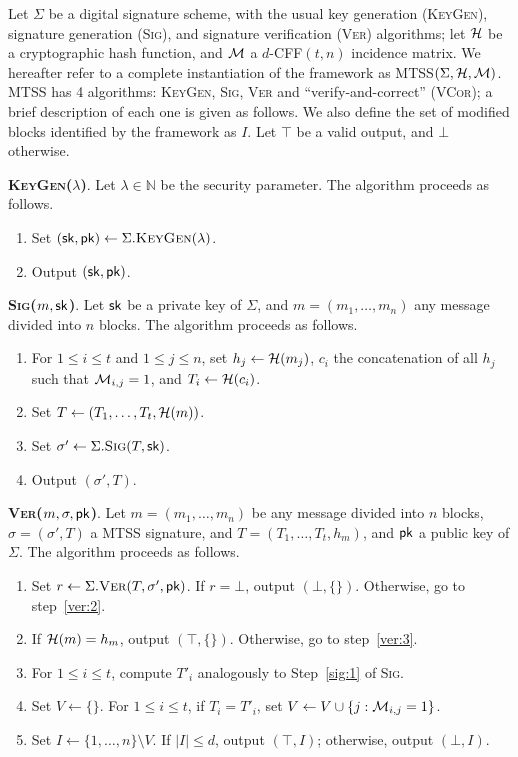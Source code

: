 \documentclass[12pt]{article}
\begin{document}
Let $\Sigma$ be a digital signature scheme, with the usual key generation (\textsc{KeyGen}), signature generation (\textsc{Sig}), and signature verification (\textsc{Ver}) algorithms; let $\mathcal{H}$ be a cryptographic hash function, and $\mathcal{M}$ a $d$-CFF$(t, n)$ incidence matrix. We hereafter refer to a complete instantiation of the framework as \textsc{MTSS}$(\Sigma, \mathcal{H}, \mathcal{M})$. MTSS has 4 algorithms: \textsc{KeyGen}, \textsc{Sig}, \textsc{Ver} and ``verify-and-correct'' (\textsc{VCor}); a brief description of each one is given as follows. We also define the set of modified blocks identified by the framework as $I$. Let $\top$ be a valid output, and $\bot$ otherwise.

\noindent \textbf{\textsc{KeyGen}($\lambda$)}. 
Let $\lambda \in \mathbb{N}$ be the security parameter. The algorithm proceeds as follows.
\begin{enumerate}
  \item Set $(\mathsf{sk}, \mathsf{pk}) \leftarrow \Sigma.\textsc{KeyGen}(\lambda)$.
  \item Output $(\mathsf{sk}, \mathsf{pk})$.    
\end{enumerate}

\noindent \textbf{\textsc{Sig}($m, \mathsf{sk}$)}.
Let $\mathsf{sk}$ be a private key of $\Sigma$, and $m = (m_{1}, \dots, m_{n})$ any message divided into $n$ blocks. The algorithm proceeds as follows.
\begin{enumerate}
  \item\label{sig:1} For $1 \leq i \leq t$ and $1 \leq j \leq n$, set $h_j \leftarrow \mathcal{H}(m_{j})$, $c_i$ the concatenation of all $h_j$ such that $\mathcal{M}_{i,j} = 1$, and $T_{i} \leftarrow \mathcal{H}(c_{i})$.
  \item\label{sig:2} Set $T \leftarrow (T_{1}, \dots, T_{t}, \mathcal{H}(m))$.
  \item\label{sig:3} Set $\sigma' \leftarrow \Sigma.\textsc{Sig}(T, \mathsf{sk})$.
  \item\label{sig:4} Output $(\sigma', T)$.
\end{enumerate}

\noindent \textbf{\textsc{Ver}($m, \sigma, \mathsf{pk}$)}.
Let $m = (m_{1}, \dots, m_{n})$ be any message divided into $n$ blocks, $\sigma = (\sigma', T)$ a MTSS signature, and $T = (T_{1}, \dots, T_{t}, h_m)$, and $\mathsf{pk}$ a public key of $\Sigma$. The algorithm proceeds as follows.
\begin{enumerate}
  \item\label{ver:1} Set $r \leftarrow \Sigma.\textsc{Ver}(T, \sigma', \mathsf{pk})$. If $r = \bot$, output $(\bot, \{\})$. Otherwise, go to step~\ref{ver:2}.
  \item\label{ver:2} If $\mathcal{H}(m) = h_m$, output $(\top, \{\})$. Otherwise, go to step~\ref{ver:3}.
  \item\label{ver:3} For $1 \leq i \leq t$, compute $T'_{i}$ analogously to Step~\ref{sig:1} of \textsc{Sig}.
  \item\label{ver:4} Set $V \leftarrow \{\}$. For $1 \leq i \leq t$, if $T_{i} = T'_{i}$, set $V \leftarrow V \cup \{j : \mathcal{M}_{i,j} = 1\}$.
  \item\label{ver:5} Set $I \leftarrow \{1, \dots, n\} \setminus V$. If $|I| \leq d$, output $(\top, I)$; otherwise, output $(\bot, I)$.
\end{enumerate}
\end{document}
